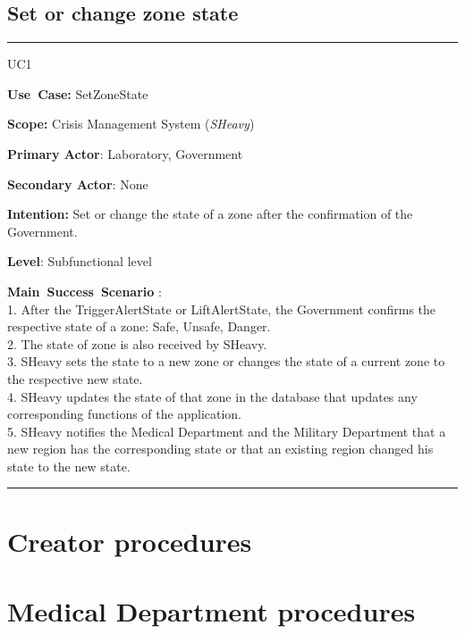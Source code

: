 \subsection{Set or change zone state}
\vspace{0.5cm}
\hrule
\vspace{0.5cm}
\begin{lyxlist}{UC1}
\small{
\item [\textbf{Use~Case:}] SetZoneState
\item [\textbf{Scope:}] Crisis Management System (\emph{SHeavy})
\item [\textbf{Primary Actor}:] Laboratory, Government
\item [\textbf{Secondary Actor}:] None
\item [\textbf{Intention:}] Set or change the state of a zone 
after the confirmation of the Government.
\item [\textbf{Level}:]Subfunctional level
\item [\textbf{Main~Success~Scenario}]:\\
1. After the TriggerAlertState or LiftAlertState, the Government confirms
 the respective state of a zone: Safe, Unsafe, Danger.\\
2. The state of zone is also received by SHeavy.\\
3. SHeavy sets the state to a new zone or changes the state of a current zone to 
the respective new state.\\
4. SHeavy updates the state of that zone in the database that updates any
corresponding functions of the application.\\
5. SHeavy notifies the Medical Department and the Military Department that a new 
region has the corresponding state or that an existing region changed his state
to the new state.\\
}
\end{lyxlist}
\hrule
\vspace{0.5cm} 


\section{Creator procedures}

\section{Medical Department procedures}

